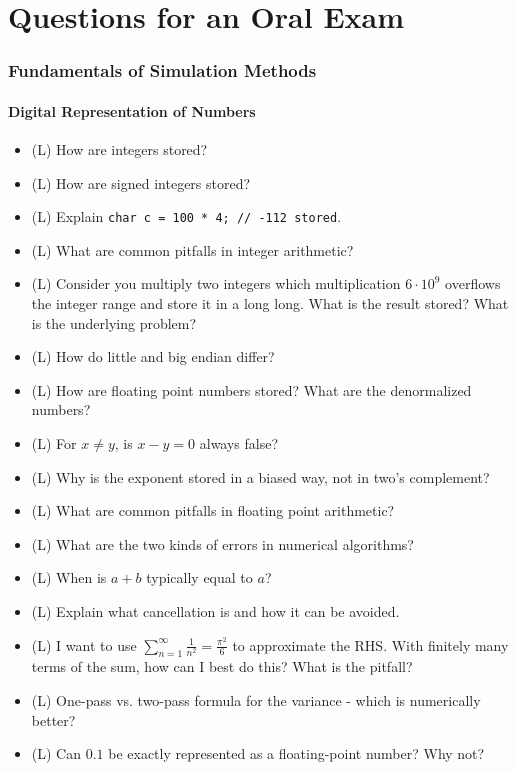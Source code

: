 \part{Questions for an Oral Exam}
\thispagestyle{plain}

\section{Fundamentals of Simulation Methods}

\subsection*{Digital Representation of Numbers}

\begin{itemize}
    \item (L) How are integers stored?
    \item (L) How are signed integers stored?
    \item (L) Explain \texttt{char c = 100 * 4; // -112 stored}.
    \item (L) What are common pitfalls in integer arithmetic?
    \item (L) Consider you multiply two integers which multiplication
    $6\cdot 10^9$ overflows the integer range and store it in a long long.
    What is the result stored? What is the underlying problem?
    \item (L) How do little and big endian differ?
    \item (L) How are floating point numbers stored? What are the denormalized numbers?
    \item (L) For $x\neq y$, is $x-y = 0$ always false?
    \item (L) Why is the exponent stored in a biased way, not in two's complement?
    \item (L) What are common pitfalls in floating point arithmetic?
    \item (L) What are the two kinds of errors in numerical algorithms?
    \item (L) When is $a + b$ typically equal to $a$?
    \item (L) Explain what cancellation is and how it can be avoided.
    \item (L) I want to use $\sum_{n=1}^{\infty} \frac{1}{n^2} = \frac{\pi^2}{6}$ to approximate
    the RHS. With finitely many terms of the sum, how can I best do this? What is the pitfall?
    \item (L) One-pass vs. two-pass formula for the variance - which is numerically better?
    \item (L) Can $0.1$ be exactly represented as a floating-point number? Why not?
\end{itemize}

